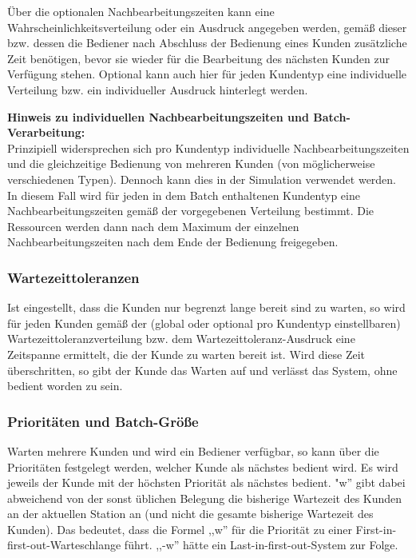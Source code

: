 Über die optionalen Nachbearbeitungszeiten kann eine Wahrscheinlichkeitsverteilung oder ein Ausdruck angegeben werden, gemäß
dieser bzw. dessen die Bediener nach Abschluss der Bedienung eines Kunden zusätzliche Zeit benötigen, bevor sie wieder für
die Bearbeitung des nächsten Kunden zur Verfügung stehen. Optional kann auch hier für jeden Kundentyp eine individuelle Verteilung
bzw. ein individueller Ausdruck hinterlegt werden.

\textbf{Hinweis zu individuellen Nachbearbeitungszeiten und Batch-Verarbeitung:}~\\
Prinzipiell widersprechen sich pro Kundentyp individuelle Nachbearbeitungszeiten und die gleichzeitige Bedienung von mehreren Kunden
(von möglicherweise verschiedenen Typen). Dennoch kann dies in der Simulation verwendet werden. In diesem Fall wird für jeden
in dem Batch enthaltenen Kundentyp eine Nachbearbeitungszeiten gemäß der vorgegebenen Verteilung bestimmt. Die Ressourcen werden
dann nach dem Maximum der einzelnen Nachbearbeitungszeiten nach dem Ende der Bedienung freigegeben.

\subsubsection*{Wartezeittoleranzen}

Ist eingestellt, dass die Kunden nur begrenzt lange bereit sind zu warten, so wird für jeden Kunden gemäß der (global oder optional
pro Kundentyp einstellbaren) Wartezeittoleranzverteilung bzw. dem Wartezeittoleranz-Ausdruck eine Zeitspanne ermittelt, die der
Kunde zu warten bereit ist. Wird diese Zeit überschritten, so gibt der Kunde das Warten auf und verlässt das System,
ohne bedient worden zu sein.

\subsubsection*{Prioritäten und Batch-Größe}

Warten mehrere Kunden und wird ein Bediener verfügbar, so kann über die Prioritäten festgelegt werden, welcher Kunde als nächstes
bedient wird. Es wird jeweils der Kunde mit der höchsten Priorität als nächstes bedient.
"w'' gibt dabei abweichend von der sonst üblichen Belegung die bisherige Wartezeit des Kunden an der aktuellen Station an (und nicht
die gesamte bisherige Wartezeit des Kunden). Das bedeutet, dass die Formel ,,w'' für die Priorität zu einer
First-in-first-out-Warteschlange führt. ,,-w'' hätte ein Last-in-first-out-System zur Folge.

